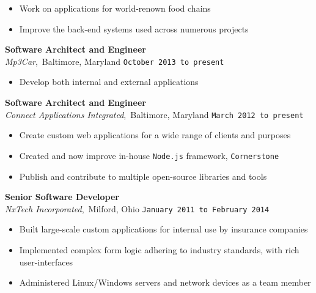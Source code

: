 \documentclass[11pt, line]{res}
\begin{document}
\begin{resume}
				\vspace{-14pt}
				\begin{itemize}
					\setlength{\itemsep}{0pt}
					\item Work on applications for world-renown food chains
					\item Improve the back-end systems used across numerous projects
				\end{itemize}

			\vspace{-12pt}
				\textbf{Software Architect and Engineer} \\
				\textit{Mp3Car},\, Baltimore, Maryland
					\hfill \texttt{October 2013 to present} \\

				\vspace{-14pt}
				\begin{itemize}
					\setlength{\itemsep}{0pt}
					\item Develop both internal and external applications
				\end{itemize}

			\vspace{-12pt}
				\textbf{Software Architect and Engineer} \\
				\textit{Connect Applications Integrated},\, Baltimore, Maryland
					\hfill \texttt{March 2012 to present} \\

				\vspace{-14pt}
				\begin{itemize}
					\setlength{\itemsep}{0pt}
					\item Create custom web applications for a wide range of clients and purposes
					\item Created and now improve in-house \texttt{Node.js} framework, \texttt{Cornerstone}
					\item Publish and contribute to multiple open-source libraries and tools
				\end{itemize}

			\vspace{-12pt}
				\textbf{Senior Software Developer} \\
				\textit{NxTech Incorporated},\, Milford, Ohio
					\hfill \texttt{January 2011 to February 2014} \\

				\vspace{-14pt}
				\begin{itemize}
					\setlength{\itemsep}{0pt}
					\item Built large-scale custom applications for internal use by insurance companies
					\item Implemented complex form logic adhering to industry standards, with rich user-interfaces
					\item Administered Linux/Windows servers and network devices as a team member
				\end{itemize}


\end{resume}
\end{document}
